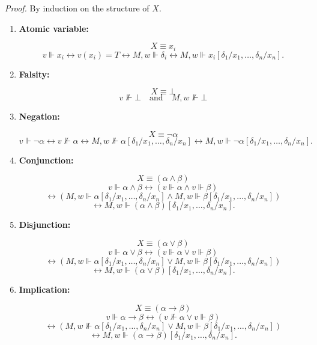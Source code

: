 \documentclass[12pt,a4paper,openany]{article}
\begin{document}
\textit{Proof.} By induction on the structure of $X$.

\begin{enumerate}
    \item \textbf{Atomic variable:}
    
    $$X \equiv x_i$$
    $$v \Vdash x_i \leftrightarrow v(x_i) = T 
    \leftrightarrow M,w \Vdash \delta_i
    \leftrightarrow M,w \Vdash x_i[\delta_1/x_1, \ldots, \delta_n/x_n].$$
    
    \item \textbf{Falsity:}
    
    $$X \equiv \bot$$
    $$v \nVdash \bot \quad \text{and} \quad M,w \nVdash \bot$$
    
    \item \textbf{Negation:}
    
    $$X \equiv \neg \alpha$$
    $$v \Vdash \neg \alpha \leftrightarrow v \nVdash \alpha
    \leftrightarrow M,w \nVdash \alpha[\delta_1/x_1, \ldots, \delta_n/x_n]
    \leftrightarrow M,w \Vdash \neg \alpha[\delta_1/x_1, \ldots, \delta_n/x_n].$$
    
    \item \textbf{Conjunction:}
    
    $$X \equiv (\alpha \land \beta)$$
    $$v \Vdash \alpha \land \beta \leftrightarrow (v \Vdash \alpha \land v \Vdash \beta)$$
    $$\leftrightarrow (M,w \Vdash \alpha[\delta_1/x_1, \ldots, \delta_n/x_n] \land M,w \Vdash \beta[\delta_1/x_1, \ldots, \delta_n/x_n])$$
    $$\leftrightarrow M,w \Vdash (\alpha \land \beta)[\delta_1/x_1, \ldots, \delta_n/x_n].$$
    
    \item \textbf{Disjunction:}
    
    $$X \equiv (\alpha \lor \beta)$$
    $$v \Vdash \alpha \lor \beta \leftrightarrow (v \Vdash \alpha \lor v \Vdash \beta)$$
    $$\leftrightarrow (M,w \Vdash \alpha[\delta_1/x_1, \ldots, \delta_n/x_n] \lor M,w \Vdash \beta[\delta_1/x_1, \ldots, \delta_n/x_n])$$
    $$\leftrightarrow M,w \Vdash (\alpha \lor \beta)[\delta_1/x_1, \ldots, \delta_n/x_n].$$
    
    \item \textbf{Implication:}
    
    $$X \equiv (\alpha \to \beta)$$
    $$v \Vdash \alpha \to \beta \leftrightarrow (v \nVdash \alpha \lor v \Vdash \beta)$$
    $$\leftrightarrow (M,w \nVdash \alpha[\delta_1/x_1, \ldots, \delta_n/x_n] \lor M,w \Vdash \beta[\delta_1/x_1, \ldots, \delta_n/x_n])$$
    $$\leftrightarrow M,w \Vdash (\alpha \to \beta)[\delta_1/x_1, \ldots, \delta_n/x_n].$$
\end{enumerate}
\end{document}
